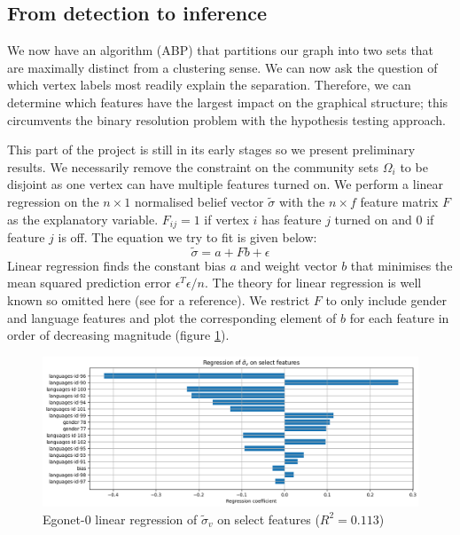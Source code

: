 \documentclass[]{article}
\begin{document}
\begin{multicols*}{2}
\subsection{From detection to inference}
\label{sect:detection-to-inference}

We now have an algorithm (ABP) that partitions our graph into two sets that are maximally distinct from a clustering sense. We can now ask the question of which vertex labels most readily explain the separation. Therefore, we can determine which features have the largest impact on the graphical structure; this circumvents the binary resolution problem with the hypothesis testing approach.

This part of the project is still in its early stages so we present preliminary results. We necessarily remove the constraint on the community sets $\Omega_i$ to be disjoint as one vertex can have multiple features turned on. We perform a linear regression on the $n \times 1$ normalised belief vector $\tilde{\sigma}$ with the $n \times f$ feature matrix $F$ as the explanatory variable. $F_{ij} = 1$ if vertex $i$ has feature $j$ turned on and $0$ if feature $j$ is off. The equation we try to fit is given below:
%
\begin{equation}
	\tilde{\sigma} = a + F b + \epsilon
	\label{eqn:lin-regression}
\end{equation}
%
Linear regression finds the constant bias $a$ and weight vector $b$ that minimises the mean squared prediction error $\epsilon^T \epsilon / n$. The theory for linear regression is well known so omitted here (see \cite{yale-linear-regression} for a reference). We restrict $F$ to only include gender and language features and plot the corresponding element of $b$ for each feature in order of decreasing magnitude (figure \ref{fig:abp-output-lin-regression}).
%
\begin{figure}[H]
	\includegraphics[width=\linewidth]{ego-0-abp-lin-regression.png}
	\caption{Egonet-0 linear regression of $\tilde{\sigma}_v$ on select features ($R^2 = 0.113$)}
	\label{fig:abp-output-lin-regression}
\end{figure}


\end{multicols*}
\end{document}
